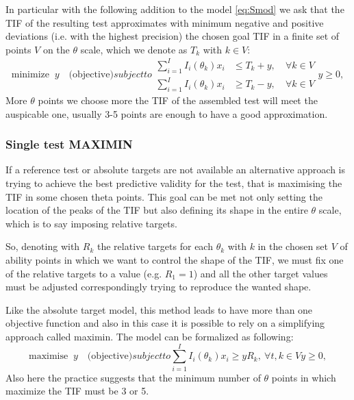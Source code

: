 In particular with the following addition to the model \eqref{eq:Smod} we ask that the TIF of the resulting test approximates with minimum negative and positive deviations (i.e. with the highest precision) the chosen goal TIF in a finite set of points $V$ on the $\theta$ scale, which we denote as $T_{k}$ with $k \in V$:
\begin{subequations}[intermezzo]
	\begin{equation}
	\mbox{minimize } \ y \quad \mbox{(objective)}
	\end{equation}
	subject to
	\begin{alignat}{2}
	\label{eq:SMINIMAX1}
	\sum_{i=1}^I I_i(\theta_{k}) x_{i} & \le T_{k}+ y, &\ \forall k \in V \\
	\label{eq:SMINIMAX2}
	\sum_{i=1}^I I_i(\theta_{k}) x_{i} & \ge T_{k}- y, &\ \forall k \in V
	\end{alignat}
	\begin{equation*}
	y \ge 0,
	\end{equation*}
	\label{eq:SMINIMAX}
\end{subequations}
More $\theta$ points we choose more the TIF of the assembled test will meet the auspicable one, usually 3-5 points are enough to have a good approximation.

\subsubsection{Single test MAXIMIN}\label{sec:single-test-maximin}
If a reference test or absolute targets are not available an alternative approach is trying to achieve the best predictive validity for the test, that is maximising the TIF in some chosen theta points. This goal can be met not only setting the location of the peaks of the TIF but also defining its shape in the entire $\theta$ scale, which is to say imposing relative targets.


So, denoting with $R_k$ the relative targets for each $\theta_k$ with $k$ in the chosen set $V$ of ability points in which we want to control the shape of the TIF, we must fix one of the relative targets to a value (e.g. $R_1=1$) and all the other target values must be adjusted correspondingly trying to reproduce the wanted shape.


Like the absolute target model, this method leads to have more than one objective function and also in this case it is possible to rely on a simplifying approach called maximin. The model can be formalized as following:
\begin{subequations}
	\begin{equation}
	\mbox{maximise } \ y \quad \mbox{(objective)}
	\end{equation}
	subject to
	\begin{equation}\label{eq:SMAXIMIN1}
	\sum_{i=1}^I I_i(\theta_{k}) x_{i} \ge yR_{k}, \ \forall t,k \in V
	\end{equation}
	\begin{equation*}
	y \ge 0,
	\end{equation*}
	\label{eq:SMAXIMIN}
\end{subequations}
Also here the practice suggests that the minimum number of $\theta$ points in which maximize the TIF must be 3 or 5.


